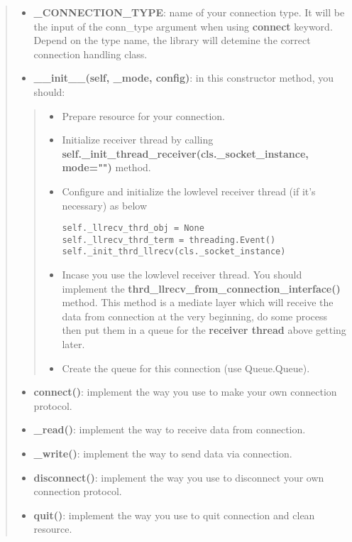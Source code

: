 \begin{quote}
\begin{itemize}
\tightlist
\item
  \textbf{\_CONNECTION\_TYPE}: name of your connection type. It will be
  the input of the conn\_type argument when using \textbf{connect}
  keyword. Depend on the type name, the library will detemine the
  correct connection handling class.
\item
  \textbf{\_\_init\_\_(self, \_mode, config)}: in this constructor
  method, you should:
\end{itemize}

\begin{quote}
\begin{itemize}
\item
  Prepare resource for your connection.
\item
  Initialize receiver thread by calling
  \textbf{self.\_init\_thread\_receiver(cls.\_socket\_instance,
  mode="")} method.
\item
  Configure and initialize the lowlevel receiver thread (if it's
  necessary) as below

\begin{verbatim}
self._llrecv_thrd_obj = None
self._llrecv_thrd_term = threading.Event()
self._init_thrd_llrecv(cls._socket_instance)
\end{verbatim}
\item
  Incase you use the lowlevel receiver thread. You should implement the
  \textbf{thrd\_llrecv\_from\_connection\_interface()} method. This
  method is a mediate layer which will receive the data from connection
  at the very beginning, do some process then put them in a queue for
  the \textbf{receiver thread} above getting later.
\item
  Create the queue for this connection (use Queue.Queue).
\end{itemize}
\end{quote}

\begin{itemize}
\tightlist
\item
  \textbf{connect()}: implement the way you use to make your own
  connection protocol.
\item
  \textbf{\_read()}: implement the way to receive data from connection.
\item
  \textbf{\_write()}: implement the way to send data via connection.
\item
  \textbf{disconnect()}: implement the way you use to disconnect your
  own connection protocol.
\item
  \textbf{quit()}: implement the way you use to quit connection and
  clean resource.
\end{itemize}
\end{quote}

